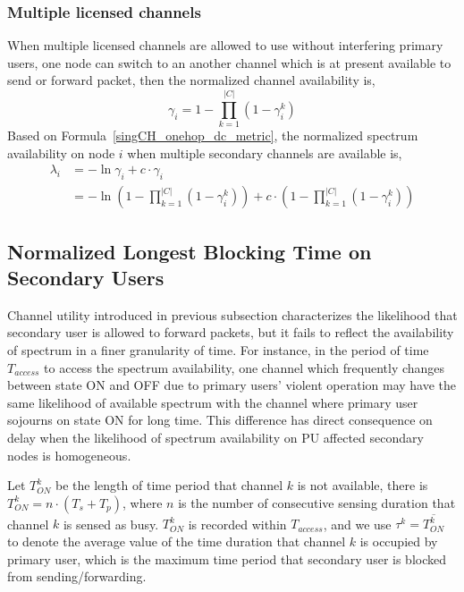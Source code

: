 \subsubsection*{Multiple licensed channels}
When multiple licensed channels are allowed to use without interfering primary users, one node can switch to an another channel which is at present available to send or forward packet, then the normalized channel availability is,
\begin{equation}
\gamma_i = 1-\prod_{k=1}^{|C|} (1-\gamma_i^k)
\label{gamma_multichannel}
\end{equation} 
Based on Formula~\ref{singCH_onehop_dc_metric}, the normalized spectrum availability on node $i$ when multiple secondary channels are available is,
\begin{equation}
\label{mulCH_onehop_dc_metric}
\begin{aligned}
\lambda_i & = -\ln \gamma_i+ c \cdot \gamma_i\\
		&= -\ln(1-\prod_{k=1}^{|C|}(1-\gamma_i^k)) + c \cdot (1-\prod_{k=1}^{|C|}(1-\gamma_i^k))
\end{aligned}
\end{equation}


\subsection{Normalized Longest Blocking Time on Secondary Users}
\label{BT}
Channel utility introduced in previous subsection characterizes the likelihood that secondary user is allowed to forward packets, but it fails to reflect the availability of spectrum in a finer granularity of time.
For instance, in the period of time $T_{access}$ to access the spectrum availability, one channel which frequently changes between state ON and OFF due to primary users' violent operation may have the same likelihood of available spectrum with the channel where primary user sojourns on state ON for long time.
This difference has direct consequence on delay when the likelihood of spectrum availability on PU affected secondary nodes is homogeneous.

Let ${T_{ON}^k}$ be the length of time period that channel $k$ is not available, there is ${T_{ON}^k} = n\cdot (T_s+T_p)$, where $n$ is the number of consecutive sensing duration that channel $k$ is sensed as busy.
${T_{ON}^k}$ is recorded within $T_{access}$, and we use $\tau^k = \overline {T_{ON}^k}$ to denote the average value of the time duration that channel $k$ is occupied by primary user, which is the maximum time period that secondary user is blocked from sending/forwarding.


